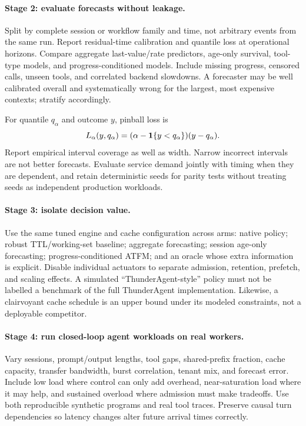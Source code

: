 \paragraph{Stage 2: evaluate forecasts without leakage.}
Split by complete session or workflow family and time, not arbitrary events
from the same run. Report residual-time calibration and quantile loss at
operational horizons. Compare aggregate last-value/rate predictors, age-only
survival, tool-type models, and progress-conditioned models. Include missing
progress, censored calls, unseen tools, and correlated backend slowdowns.
A forecaster may be well calibrated overall and systematically wrong for the
largest, most expensive contexts; stratify accordingly.

For quantile $q_\alpha$ and outcome $y$, pinball loss is
\begin{equation}
 L_\alpha(y,q_\alpha)=(\alpha-\mathbf{1}\{y<q_\alpha\})(y-q_\alpha).
\end{equation}
Report empirical interval coverage as well as width. Narrow incorrect intervals
are not better forecasts. Evaluate service demand jointly with timing when they
are dependent, and retain deterministic seeds for parity tests without treating
seeds as independent production workloads.

\paragraph{Stage 3: isolate decision value.}
Use the same tuned engine and cache configuration across arms: native policy;
robust TTL/working-set baseline; aggregate forecasting; session age-only
forecasting; progress-conditioned ATFM; and an oracle whose extra information is
explicit. Disable individual actuators to separate admission, retention,
prefetch, and scaling effects. A simulated ``ThunderAgent-style'' policy must
not be labelled a benchmark of the full ThunderAgent implementation. Likewise,
a clairvoyant cache schedule is an upper bound under its modeled constraints,
not a deployable competitor.

\paragraph{Stage 4: run closed-loop agent workloads on real workers.}
Vary sessions, prompt/output lengths, tool gaps, shared-prefix fraction, cache
capacity, transfer bandwidth, burst correlation, tenant mix, and forecast error.
Include low load where control can only add overhead, near-saturation load where
it may help, and sustained overload where admission must make tradeoffs. Use
both reproducible synthetic programs and real tool traces. Preserve causal
turn dependencies so latency changes alter future arrival times correctly.

